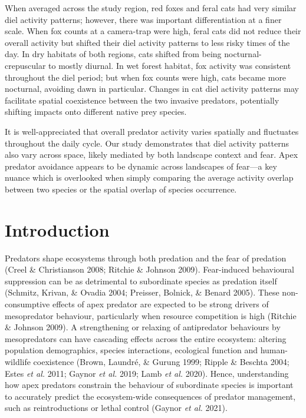 \documentclass[11pt,a4paper,titlepage,twoside,openright]{style/unimelbthesis}
\begin{document}
\begin{mainmatter}
When averaged across the study region, red foxes and feral cats had very similar diel activity patterns; however, there was important differentiation at a finer scale. When fox counts at a camera-trap were high, feral cats did not reduce their overall activity but shifted their diel activity patterns to less risky times of the day. In dry habitats of both regions, cats shifted from being nocturnal-crepuscular to mostly diurnal. In wet forest habitat, fox activity was consistent throughout the diel period; but when fox counts were high, cats became more nocturnal, avoiding dawn in particular. Changes in cat diel activity patterns may facilitate spatial coexistence between the two invasive predators, potentially shifting impacts onto different native prey species.

It is well-appreciated that overall predator activity varies spatially and fluctuates throughout the daily cycle. Our study demonstrates that diel activity patterns also vary across space, likely mediated by both landscape context and fear. Apex predator avoidance appears to be dynamic across landscapes of fear---a key nuance which is overlooked when simply comparing the average activity overlap between two species or the spatial overlap of species occurrence.

\newpage

\hypertarget{introduction-3}{%
\section{Introduction}\label{introduction-3}}

Predators shape ecosystems through both predation and the fear of predation (Creel \& Christianson 2008; Ritchie \& Johnson 2009). Fear-induced behavioural suppression can be as detrimental to subordinate species as predation itself (Schmitz, Krivan, \& Ovadia 2004; Preisser, Bolnick, \& Benard 2005). These non-consumptive effects of apex predator are expected to be strong drivers of mesopredator behaviour, particularly when resource competition is high (Ritchie \& Johnson 2009). A strengthening or relaxing of antipredator behaviours by mesopredators can have cascading effects across the entire ecosystem: altering population demographics, species interactions, ecological function and human-wildlife coexistence (Brown, Laundré, \& Gurung 1999; Ripple \& Beschta 2004; Estes \emph{et al.} 2011; Gaynor \emph{et al.} 2019; Lamb \emph{et al.} 2020). Hence, understanding how apex predators constrain the behaviour of subordinate species is important to accurately predict the ecosystem-wide consequences of predator management, such as reintroductions or lethal control (Gaynor \emph{et al.} 2021).


\end{mainmatter}
\end{document}
